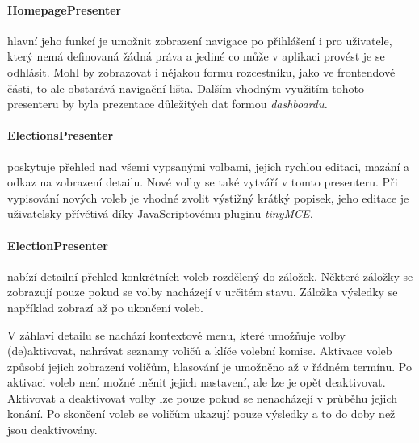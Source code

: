 \paragraph{HomepagePresenter} hlavní jeho funkcí je umožnit zobrazení navigace po přihlášení i pro uživatele, který nemá definovaná žádná práva a jediné co může v aplikaci provést je se odhlásit. Mohl by zobrazovat i nějakou formu rozcestníku, jako ve frontendové části, to ale obstarává navigační lišta. Dalším vhodným využitím tohoto presenteru by byla prezentace důležitých dat formou \it{dashboardu}.


\paragraph{ElectionsPresenter} poskytuje přehled nad všemi vypsanými volbami, jejich rychlou editaci, mazání a odkaz na zobrazení detailu. Nové volby se také vytváří v tomto presenteru. Při vypisování nových voleb je vhodné zvolit výstižný krátký popisek, jeho editace je uživatelsky přívětivá díky JavaScriptovému pluginu \it{tinyMCE}.


\paragraph{ElectionPresenter} nabízí detailní přehled konkrétních voleb rozdělený do záložek. Některé záložky se zobrazují pouze pokud se volby nacházejí v určitém stavu. Záložka výsledky se například zobrazí až po ukončení voleb. 

V záhlaví detailu se nachází kontextové menu, které umožňuje volby (de)aktivovat, nahrávat seznamy voličů a klíče volební komise. Aktivace voleb způsobí jejich zobrazení voličům, hlasování je umožněno až v řádném termínu. Po aktivaci voleb není možné měnit jejich nastavení, ale lze je opět deaktivovat. Aktivovat a deaktivovat volby lze pouze pokud se nenacházejí v průběhu jejich konání. Po skončení voleb se voličům ukazují pouze výsledky a to do doby než jsou deaktivovány.

